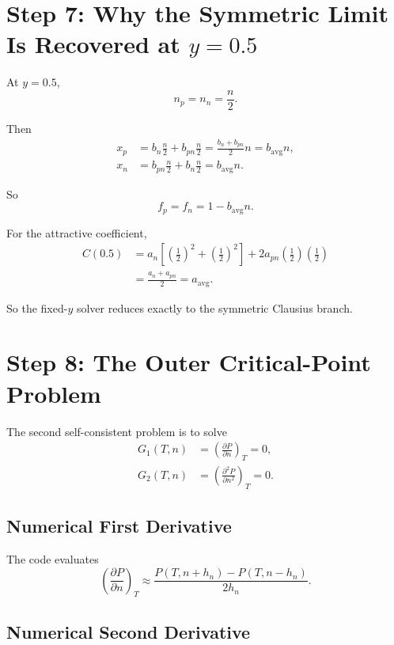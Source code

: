 \documentclass[11pt]{article}
\begin{document}
\section{Step 7: Why the Symmetric Limit Is Recovered at \texorpdfstring{$y=0.5$}{y=0.5}}

At $y=0.5$,
\[
n_p=n_n=\frac{n}{2}.
\]

Then
\begin{align}
x_p &= b_n\frac{n}{2}+b_{pn}\frac{n}{2}
= \frac{b_n+b_{pn}}{2}n
= b_{\mathrm{avg}}n, \\
x_n &= b_{pn}\frac{n}{2}+b_n\frac{n}{2}
= b_{\mathrm{avg}}n.
\end{align}

So
\[
f_p=f_n=1-b_{\mathrm{avg}}n.
\]

For the attractive coefficient,
\begin{align}
C(0.5)
&=
a_n\left[\left(\frac12\right)^2+\left(\frac12\right)^2\right]
+2a_{pn}\left(\frac12\right)\left(\frac12\right) \\
&=
\frac{a_n+a_{pn}}{2}
=
a_{\mathrm{avg}}.
\end{align}

So the fixed-$y$ solver reduces exactly to the symmetric Clausius branch.

\section{Step 8: The Outer Critical-Point Problem}

The second self-consistent problem is to solve
\begin{align}
G_1(T,n) &= \left(\frac{\partial P}{\partial n}\right)_T = 0, \\
G_2(T,n) &= \left(\frac{\partial^2 P}{\partial n^2}\right)_T = 0.
\end{align}

\subsection{Numerical First Derivative}

The code evaluates
\begin{equation}
\left(\frac{\partial P}{\partial n}\right)_T
\approx
\frac{P(T,n+h_n)-P(T,n-h_n)}{2h_n}.
\end{equation}

\subsection{Numerical Second Derivative}
\end{document}
